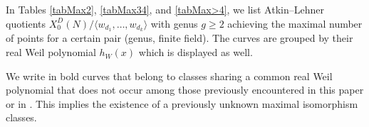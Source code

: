 \documentclass[11pt,reqno]{amsart}
\theoremstyle{definition}
\begin{document}

In Tables \ref{tabMax2}, \ref{tabMax34}, and \ref{tabMax>4}, we list Atkin--Lehner quotients $X_0^D(N)/\langle w_{d_1},\ldots,w_{d_k}\rangle$ with genus $g\ge 2$ achieving the maximal number of points for a certain pair (genus, finite field). %
The curves are grouped by their real Weil polynomial $h_W(x)$ which is displayed as well.

We write in bold curves that belong to classes sharing a common real Weil polynomial that does not occur among those previously encountered in this paper or in \cite[Appendix C, Tables 11, 12, and 13]{DLMS26}. This implies the existence of a previously unknown maximal isomorphism classes.
\end{document}
